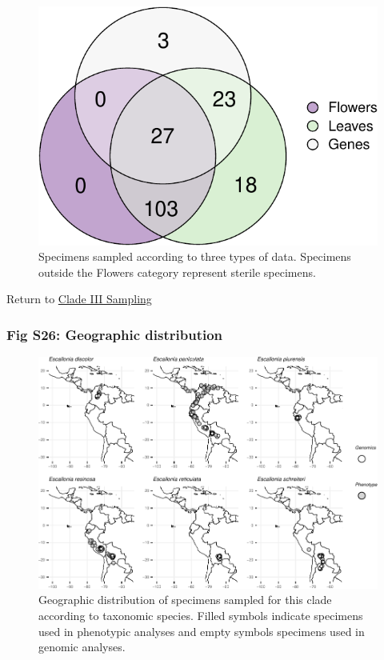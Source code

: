 \documentclass[
  11pt,
]{article}
\begin{document}
\begin{figure}

{\centering \includegraphics{Supplementary_Material_files/figure-latex/CladeIIIVennDiagram-1} 

}

\caption{Specimens sampled according to three types of data. Specimens outside the Flowers category represent sterile specimens.}\label{fig:CladeIIIVennDiagram}
\end{figure}

Return to \protect\hyperlink{sampling-3}{Clade III Sampling}
\pagebreak

\hypertarget{fig-s26-geographic-distribution}{%
\subsubsection{Fig S26: Geographic distribution}\label{fig-s26-geographic-distribution}}

\begin{figure}

{\centering \includegraphics{Supplementary_Material_files/figure-latex/CladeIIIsamplingMaps-1} 

}

\caption{Geographic distribution of specimens sampled for this clade according to taxonomic species. Filled symbols indicate specimens used in phenotypic analyses and empty symbols specimens used in genomic analyses.}\label{fig:CladeIIIsamplingMaps}
\end{figure}
\end{document}
